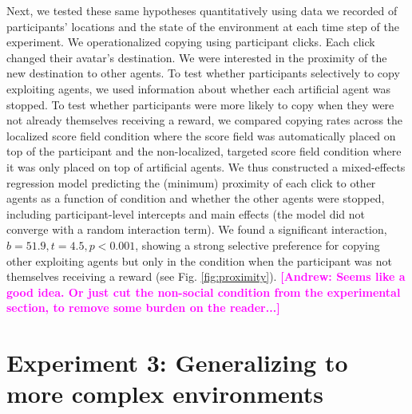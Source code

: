 \documentclass[12pt,letterpaper]{article}
\newcommand{\andrew}[1]{\textcolor{magenta}{\bf [Andrew: #1]}}
\begin{document}
Next, we tested these same hypotheses quantitatively using data we recorded of participants' locations and the state of the environment at each time step of the experiment.
We operationalized copying using participant clicks.
Each click changed their avatar's destination. 
We were interested in the proximity of the new destination to other agents.
To test whether participants selectively to copy exploiting agents, we used information about whether each artificial agent was stopped.
To test whether participants were more likely to copy when they were not already themselves receiving a reward, we compared copying rates across the localized score field condition where the score field was automatically placed on top of the participant and the non-localized, targeted score field condition where it was only placed on top of artificial agents.
We thus constructed a mixed-effects regression model predicting the (minimum) proximity of each click to other agents as a function of condition and whether the other agents were stopped, including participant-level intercepts and main effects (the model did not converge with a random interaction term). 
We found a significant interaction, $b = 51.9, t = 4.5, p < 0.001$, showing a strong selective preference for copying other exploiting agents but only in the condition when the participant was not themselves receiving a reward (see Fig. \ref{fig:proximity}). 
\andrew{Seems like a good idea. Or just cut the non-social condition from the experimental section, to remove some burden on the reader...}

\section{Experiment 3: Generalizing to more complex environments}
\end{document}
